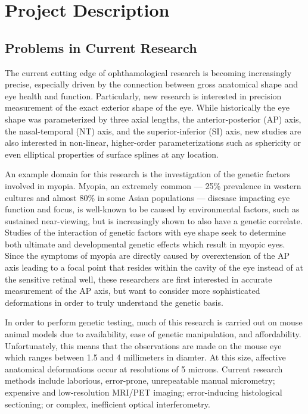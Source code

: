 \documentclass{article}
\begin{document}

\tableofcontents
\newpage

\section{Project Description}
\label{sec:project-description}

\subsection{Problems in Current Research}
\label{sec:probl-curr-rese}

The current cutting edge of ophthamological research is becoming
increasingly precise, especially driven by the connection between
gross anatomical shape and eye health and function. Particularly, new
research is interested in precision measurement of the exact exterior
shape of the
eye\cite{zhou99:genes,zhou99:models,schaeffel04,atchison04}. While
historically the eye shape was parameterized by three axial lengths,
the anterior-posterior (AP) axis, the nasal-temporal (NT) axis, and
the superior-inferior (SI) axis, new studies are also interested in
non-linear, higher-order parameterizations such as sphericity or even
elliptical properties of surface splines at any location.

An example domain for this research is the investigation of the
genetic factors involved in myopia. Myopia, an extremely common ---
25\% prevalence in western cultures and almost 80\% in some Asian
populations\cite{rajan98} --- disesase impacting eye function and
focus, is well-known to be caused by environmental factors, such as
sustained near-viewing, but is increasingly shown to also have a
genetic
correlate\cite{zhou99:genes,zhou99:models,schmucker04}. Studies of the
interaction of genetic factors with eye shape seek to determine both
ultimate and developmental genetic effects which result in myopic
eyes. Since the symptoms of myopia are directly caused by
overextension of the AP axis leading to a focal point that resides
within the cavity of the eye instead of at the sensitive retinal well,
these researchers are first interested in accurate measurement of the
AP axis\cite{wallman04}, but want to consider more sophisticated
deformations in order to truly understand the genetic
basis\cite{schaeffel04}.

In order to perform genetic testing, much of this research is carried
out on mouse animal models due to availability, ease of genetic
manipulation, and affordability\cite{schaeffel04}. Unfortunately, this
means that the observations are made on the mouse eye which ranges
between 1.5 and 4 millimeters in diamter. At this size, affective
anatomical deformations occur at resolutions of 5 microns. Current
research methods include laborious, error-prone, unrepeatable manual
micrometry\cite{wallman04}; expensive and low-resolution MRI/PET
imaging\cite{atchison04}; error-inducing histological
sectioning\cite{schaeffel04}; or complex, inefficient optical
interferometry\cite{schaeffel04,guggenheim04}.
\end{document}
